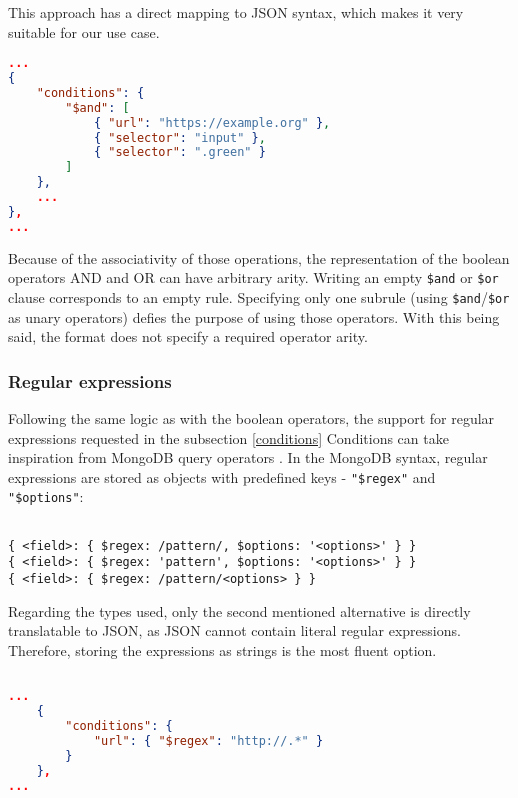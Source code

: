 This approach has a direct mapping to JSON syntax, which makes it very suitable for our use case.

\begin{minipage}{0.95\linewidth}
\begin{lstlisting}[language=json, columns=spaceflexible]
...
{
    "conditions": {
        "$and": [
            { "url": "https://example.org" },
            { "selector": "input" },
            { "selector": ".green" }
        ]
    },
    ...
},
...

\end{lstlisting}
\end{minipage}

Because of the associativity of those operations, the representation of the boolean operators AND and OR can have arbitrary arity.
Writing an empty \texttt{\$and} or \texttt{\$or} clause corresponds to an empty rule. 
Specifying only one subrule (using \texttt{\$and}/\texttt{\$or} as unary operators) defies the purpose of using those operators. 
With this being said, the format does not specify a required operator arity. 

\subsubsection{Regular expressions}

Following the same logic as with the boolean operators, the support for regular expressions requested in the subsection \ref{conditions} Conditions can take inspiration from MongoDB query operators .
In the MongoDB syntax, regular expressions are stored as objects with predefined keys - \texttt{"\$regex"} and \texttt{"\$options"}:

\begin{minipage}{0.95\linewidth}
    \begin{verbatim}
    
{ <field>: { $regex: /pattern/, $options: '<options>' } }
{ <field>: { $regex: 'pattern', $options: '<options>' } }
{ <field>: { $regex: /pattern/<options> } }
    \end{verbatim}
\end{minipage}

Regarding the types used, only the second mentioned alternative is directly translatable to JSON, as JSON cannot contain literal regular expressions. 
Therefore, storing the expressions as strings is the most fluent option.

\begin{minipage}{0.95\linewidth}
\begin{lstlisting}[language=json, columns=spaceflexible]
        
...
    { 
        "conditions": {
            "url": { "$regex": "http://.*" }
        } 
    },
...

\end{lstlisting}
\end{minipage}
    